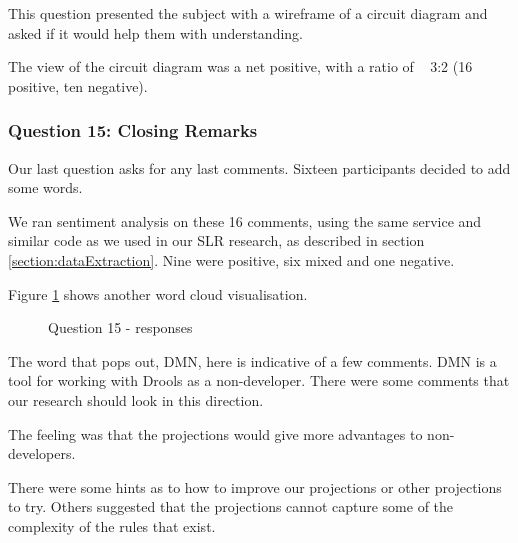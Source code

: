 This question presented the subject with a wireframe of a circuit diagram and asked if it would help them with understanding.

The view of the circuit diagram was a net positive, with a ratio of ~ 3:2 (16 positive, ten negative).

\subsubsection{Question 15: Closing Remarks}

Our last question asks for any last comments.
Sixteen participants decided to add some words.

We ran sentiment analysis on these 16 comments, using the same service and similar code as we used in our SLR research, as described in section \ref{section:dataExtraction}.
Nine were positive, six mixed and one negative.

Figure \ref{fig:Q15_wordcloud} shows another word cloud visualisation.

\begin{figure}
    \centering
    \caption{Question 15 - responses}
    \label{fig:Q15_wordcloud}
\end{figure}

The word that pops out, DMN, here is indicative of a few comments.
DMN is a tool for working with Drools as a non-developer.
There were some comments that our research should look in this direction.

The feeling was that the projections would give more advantages to non-developers.

There were some hints as to how to improve our projections or other projections to try.
Others suggested that the projections cannot capture some of the complexity of the rules that exist.


